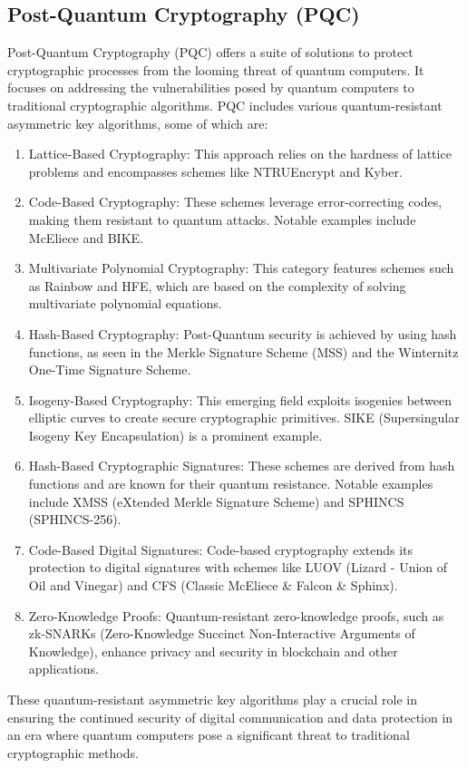\documentclass{article}
\begin{document}
\subsection{Post-Quantum Cryptography (PQC)}
Post-Quantum Cryptography (PQC) offers a suite of solutions to protect cryptographic processes from the looming threat of quantum computers. It focuses on addressing the vulnerabilities posed by quantum computers to traditional cryptographic algorithms. PQC includes various quantum-resistant asymmetric key algorithms, some of which are:
\begin{enumerate}
    \item Lattice-Based Cryptography: This approach relies on the hardness of lattice problems and encompasses schemes like NTRUEncrypt and Kyber.
    \item Code-Based Cryptography: These schemes leverage error-correcting codes, making them resistant to quantum attacks. Notable examples include McEliece and BIKE.
    \item Multivariate Polynomial Cryptography: This category features schemes such as Rainbow and HFE, which are based on the complexity of solving multivariate polynomial equations.
    \item Hash-Based Cryptography: Post-Quantum security is achieved by using hash functions, as seen in the Merkle Signature Scheme (MSS) and the Winternitz One-Time Signature Scheme.
    \item Isogeny-Based Cryptography: This emerging field exploits isogenies between elliptic curves to create secure cryptographic primitives. SIKE (Supersingular Isogeny Key Encapsulation) is a prominent example.
    \item Hash-Based Cryptographic Signatures: These schemes are derived from hash functions and are known for their quantum resistance. Notable examples include XMSS (eXtended Merkle Signature Scheme) and SPHINCS (SPHINCS-256).
    \item Code-Based Digital Signatures: Code-based cryptography extends its protection to digital signatures with schemes like LUOV (Lizard - Union of Oil and Vinegar) and CFS (Classic McEliece \& Falcon \& Sphinx).
    \item Zero-Knowledge Proofs: Quantum-resistant zero-knowledge proofs, such as zk-SNARKs (Zero-Knowledge Succinct Non-Interactive Arguments of Knowledge), enhance privacy and security in blockchain and other applications.
\end{enumerate}

These quantum-resistant asymmetric key algorithms play a crucial role in ensuring the continued security of digital communication and data protection in an era where quantum computers pose a significant threat to traditional cryptographic methods.
\end{document}
